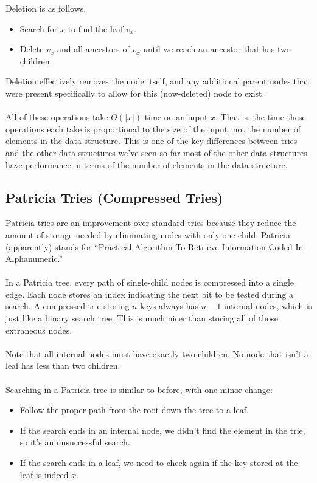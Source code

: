 \documentclass[]{article}
\theoremstyle{definition}
\begin{document}
		Deletion is as follows.
		\begin{itemize}
			\item Search for $x$ to find the leaf $v_x$.
			\item Delete $v_x$ and all ancestors of $v_x$ until we reach an ancestor that has two children.
		\end{itemize}

		Deletion effectively removes the node itself, and any additional parent nodes that were present specifically to allow for this (now-deleted) node to exist.
		\\ \\
		All of these operations take $\Theta(|x|)$ time on an input $x$. That is, the time these operations each take is proportional to the size of the input, not the number of elements in the data structure. This is one of the key differences between tries and the other data structures we've seen so far \textendash{} most of the other data structures have performance in terms of the number of elements in the data structure.

		\subsection{Patricia Tries (Compressed Tries)}
			Patricia tries are an improvement over standard tries because they reduce the amount of storage needed by eliminating nodes with only one child. Patricia (apparently) stands for ``Practical Algorithm To Retrieve Information Coded In Alphanumeric.''
			\\ \\
			In a Patricia tree, every path of single-child nodes is compressed into a single edge. Each node stores an index indicating the next bit to be tested during a search. A compressed trie storing $n$ keys always has $n - 1$ internal nodes, which is just like a binary search tree. This is much nicer than storing all of those extraneous nodes.
			\\ \\
			Note that all internal nodes must have exactly two children. No node that isn't a leaf has less than two children.
			\\ \\
			Searching in a Patricia tree is similar to before, with one minor change:
			\begin{itemize}
				\item Follow the proper path from the root down the tree to a leaf.
				\item If the search ends in an internal node, we didn't find the element in the trie, so it's an unsuccessful search.
				\item If the search ends in a leaf, we need to check again if the key stored at the leaf is indeed $x$.
			\end{itemize}
\end{document}
